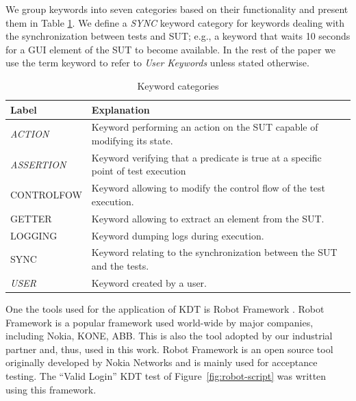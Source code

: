 We group keywords into seven categories based on their functionality and present them in Table \ref{keywords_categories}. We define a \emph{SYNC} keyword category for keywords dealing with the synchronization between tests and SUT; e.g., a keyword that waits 10 seconds for a GUI element of the SUT to become available. In the rest of the paper we use the term keyword to refer to \emph{User Keywords} unless stated otherwise.

\begin{table}
\caption{Keyword categories}
\label{keywords_categories}
\centering
\begin{tabular}{>{\raggedright}m{0.9in}>{\raggedright}m{4in}}
\toprule
\textbf{\scriptsize{Label}} & \textbf{\scriptsize{Explanation}}\tabularnewline
\toprule

\scriptsize{\textit{ACTION}} & \scriptsize{Keyword performing an action on the
SUT capable of modifying its state.} \tabularnewline

\scriptsize{\textit{ASSERTION}} & \scriptsize{Keyword verifying that a predicate
is true at a specific point of test execution} \tabularnewline

\scriptsize{CONTROLFOW} & \scriptsize{Keyword allowing to modify the
                                   control flow of the test execution.} \tabularnewline

\scriptsize{GETTER} & \scriptsize{Keyword allowing to extract an element from
the SUT.} \tabularnewline

\scriptsize{LOGGING} & \scriptsize{Keyword dumping logs during execution.}
\tabularnewline

\scriptsize{SYNC} & \scriptsize{Keyword relating to the
                                  synchronization between the SUT and the tests.} \tabularnewline

\scriptsize{\textit{USER}} & \scriptsize{Keyword created by a user.}
\tabularnewline

\bottomrule
\end{tabular}
\end{table}


One the tools used for the application of KDT is Robot Framework \cite{RobotFramework2020}. Robot Framework is a popular framework used world-wide by major companies, including Nokia, KONE, ABB. This is also the tool adopted by our industrial partner and, thus, used in this work. Robot Framework is an open source tool originally developed by Nokia Networks and is mainly used for acceptance testing. The ``Valid Login'' KDT test of Figure~\ref{fig:robot-script} was written using this framework.

